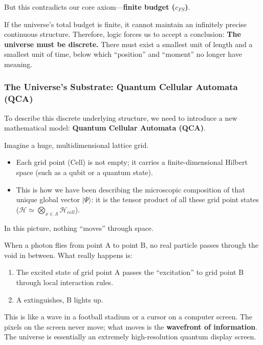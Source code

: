 But this contradicts our core axiom---\textbf{finite budget ($c_{FS}$)}.

If the universe's total budget is finite, it cannot maintain an infinitely precise continuous structure. Therefore, logic forces us to accept a conclusion: \textbf{The universe must be discrete.} There must exist a smallest unit of length and a smallest unit of time, below which ``position'' and ``moment'' no longer have meaning.

\subsubsection{The Universe's Substrate: Quantum Cellular Automata (QCA)}

To describe this discrete underlying structure, we need to introduce a new mathematical model: \textbf{Quantum Cellular Automata (QCA)}.

Imagine a huge, multidimensional lattice grid.

\begin{itemize}
\item Each grid point (Cell) is not empty; it carries a finite-dimensional Hilbert space (such as a qubit or a quantum state).

\item This is how we have been describing the microscopic composition of that unique global vector $|\Psi\rangle$: it is the tensor product of all these grid point states ($\mathcal{H} \simeq \bigotimes_{x \in \Lambda} \mathcal{H}_{cell}$).
\end{itemize}

In this picture, nothing ``moves'' through space.

When a photon flies from point A to point B, no real particle passes through the void in between. What really happens is:

\begin{enumerate}
\item The excited state of grid point A passes the ``excitation'' to grid point B through local interaction rules.

\item A extinguishes, B lights up.
\end{enumerate}

This is like a wave in a football stadium or a cursor on a computer screen. The pixels on the screen never move; what moves is the \textbf{wavefront of information}. The universe is essentially an extremely high-resolution quantum display screen.

